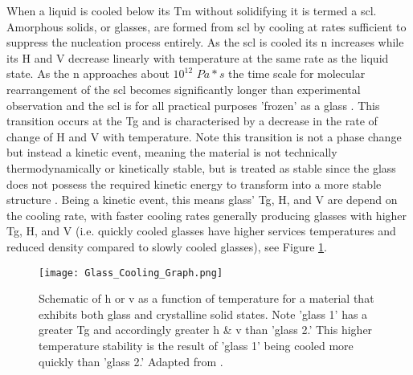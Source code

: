 \documentclass[a4paper,12pt,oneside]{report}%
\begin{document}
When a liquid is cooled below its \gls{Tm} without solidifying it is termed a \gls{scl}. Amorphous solids, or glasses, are formed from \gls{scl} by cooling at rates sufficient to suppress the nucleation process entirely. As the \gls{scl} is cooled its \gls{n} increases while its \gls{H} and \gls{V} decrease linearly with temperature at the same rate as the liquid state. As the \gls{n} approaches about $10^{12}$ $Pa*s$ the time scale for molecular rearrangement of the \gls{scl} becomes significantly longer than experimental observation and the \gls{scl} is for all practical purposes 'frozen' as a glass \cite{Ediger1996, Ishii2014}. This transition occurs at the \gls{Tg} and is characterised by a decrease in the rate of change of \gls{H} and \gls{V} with temperature. Note this transition is not a phase change but instead a kinetic event, meaning the material is not technically thermodynamically or kinetically stable, but is treated as stable since the glass does not possess the required kinetic energy to transform into a more stable structure \cite{Ediger1996, Ishii2014}. Being a kinetic event, this means glass' \gls{Tg}, \gls{H}, and \gls{V} are depend on the cooling rate, with faster cooling rates generally producing glasses with higher \gls{Tg}, \gls{H}, and \gls{V} (i.e. quickly cooled glasses have higher services temperatures and reduced density compared to slowly cooled glasses), see Figure \ref{fig:GlassCooling}. 

\begin{figure}[htbp]
	\centering
	\texttt{[image: Glass\_Cooling\_Graph.png]}
	\caption[Schematic of \gls{h} or \gls{v} as a function of temperature for a material that exhibits both glass and crystalline solid states. Note 'glass 1' has a greater \acrshort{Tg} and accordingly greater \gls{h} \& \gls{v} than 'glass 2.' This higher temperature stability is the result of 'glass 1' being cooled more quickly than 'glass 2.']{Schematic of \gls{h} or \gls{v} as a function of temperature for a material that exhibits both glass and crystalline solid states. Note 'glass 1' has a greater \acrshort{Tg} and accordingly greater \gls{h} \& \gls{v} than 'glass 2.' This higher temperature stability is the result of 'glass 1' being cooled more quickly than 'glass 2.' Adapted from \cite{Ediger1996}.}
	\label{fig:GlassCooling}
\end{figure}
\end{document}
